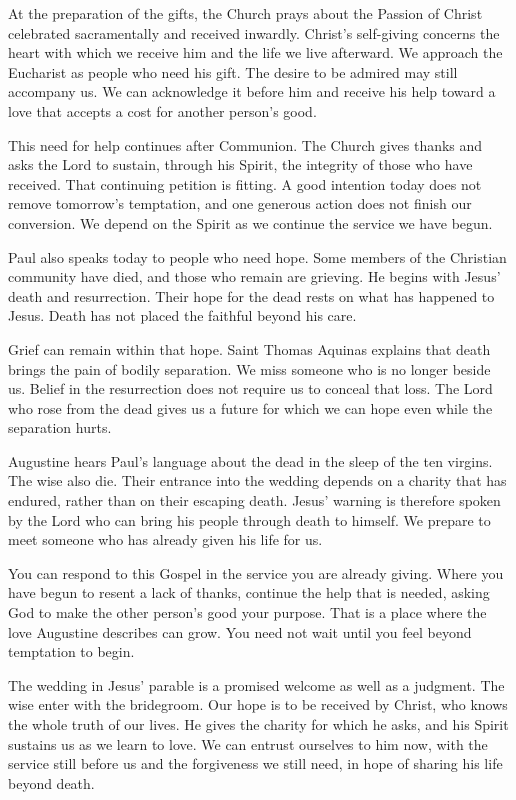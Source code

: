 At the preparation of the gifts, the Church prays about the Passion of Christ celebrated sacramentally and received inwardly. Christ's self-giving concerns the heart with which we receive him and the life we live afterward. We approach the Eucharist as people who need his gift. The desire to be admired may still accompany us. We can acknowledge it before him and receive his help toward a love that accepts a cost for another person's good.

This need for help continues after Communion. The Church gives thanks and asks the Lord to sustain, through his Spirit, the integrity of those who have received. That continuing petition is fitting. A good intention today does not remove tomorrow's temptation, and one generous action does not finish our conversion. We depend on the Spirit as we continue the service we have begun.

Paul also speaks today to people who need hope. Some members of the Christian community have died, and those who remain are grieving. He begins with Jesus' death and resurrection. Their hope for the dead rests on what has happened to Jesus. Death has not placed the faithful beyond his care.

Grief can remain within that hope. Saint Thomas Aquinas explains that death brings the pain of bodily separation. We miss someone who is no longer beside us. Belief in the resurrection does not require us to conceal that loss. The Lord who rose from the dead gives us a future for which we can hope even while the separation hurts.

Augustine hears Paul's language about the dead in the sleep of the ten virgins. The wise also die. Their entrance into the wedding depends on a charity that has endured, rather than on their escaping death. Jesus' warning is therefore spoken by the Lord who can bring his people through death to himself. We prepare to meet someone who has already given his life for us.

You can respond to this Gospel in the service you are already giving. Where you have begun to resent a lack of thanks, continue the help that is needed, asking God to make the other person's good your purpose. That is a place where the love Augustine describes can grow. You need not wait until you feel beyond temptation to begin.

The wedding in Jesus' parable is a promised welcome as well as a judgment. The wise enter with the bridegroom. Our hope is to be received by Christ, who knows the whole truth of our lives. He gives the charity for which he asks, and his Spirit sustains us as we learn to love. We can entrust ourselves to him now, with the service still before us and the forgiveness we still need, in hope of sharing his life beyond death.
